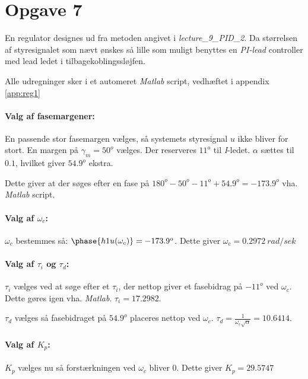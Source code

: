 \section{Opgave 7}
En regulator designes ud fra metoden angivet i \emph{lecture\_9\_PID\_2}. Da
størrelsen af styresignalet som nævt ønskes så lille som muligt benyttes en
\emph{PI-lead} controller med lead ledet i tilbagekoblingssløjfen.

Alle udregninger sker i et automeret \emph{Matlab} script, vedhæftet i appendix
\ref{app:reg1}

\paragraph{Valg af fasemargener:}
	En passende stor fasemargen vælges, så systemets styresignal $u$ ikke bliver
	for stort. En margen på $\gamma_m = 50^o$ vælges.
	Der reserveres $11^o$ til \emph{I}-ledet.
	$\alpha$ sættes til $0.1$, hvilket giver $54.9^o$ ekstra.
	
	Dette giver at der søges efter en fase på $180^o - 50^o - 11^o + 54.9^o =
	-173.9^o$ vha. \emph{Matlab} script.
\paragraph{Valg af $\omega_c$:}
	$\omega_c$ bestemmes så: $\phase{h1u(\omega_c)} = -173.9^o$. Dette giver
	$\omega_c =  0.2972~rad/sek$
\paragraph{Valg af $\tau_i$ og $\tau_d$:}
	$\tau_i$ vælges ved at søge efter et $\tau_i$, der nettop giver et fasebidrag
	på $-11^o$ ved $\omega_c$. Dette gøres igen vha. \emph{Matlab}. $\tau_i =
	17.2982$.
	
	$\tau_d$ vælges så fasebidraget på $54.9^o$ placeres nettop ved $\omega_c$.
	$\tau_d = \frac{1}{\omega_c \sqrt{\alpha}} = 10.6414$.
\paragraph{Valg af $K_p$:}
	$K_p$ vælges nu så forstærkningen ved $\omega_c$ bliver 0.
	Dette giver $K_p = 29.5747$
	
